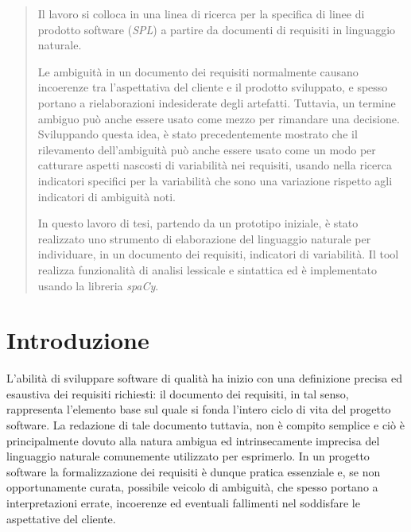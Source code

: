 \documentclass[12pt]{report}
\newcommand{\spacy}{\textsl{spaCy}\xspace}
\newcommand{\spl}{\textsl{SPL}\xspace}
\begin{document}


\clearpage\thispagestyle{empty}
\null\newpage


\tableofcontents


\clearpage\thispagestyle{empty}
\null\newpage

\clearpage\thispagestyle{empty}
\null\newpage


\setcounter{tempCntr}{\value{page}}


\begin{abstract}
\thispagestyle{plain}
\setcounter{page}{\value{tempCntr}}
Il lavoro si colloca in una linea di ricerca per la specifica di linee di prodotto software (\spl) a partire da documenti di requisiti in linguaggio naturale.

Le ambiguità in un documento dei requisiti normalmente causano incoerenze tra l'aspettativa del cliente e il prodotto sviluppato, e spesso portano a rielaborazioni indesiderate degli artefatti.  Tuttavia, un termine ambiguo può anche essere usato come mezzo per rimandare una decisione. Sviluppando questa idea, è stato precedentemente mostrato che il rilevamento dell'ambiguità può anche essere usato come un modo per catturare aspetti nascosti di variabilità nei requisiti, usando nella ricerca indicatori specifici per la variabilità che sono una variazione rispetto agli indicatori di ambiguità noti.

In questo lavoro di tesi, partendo da un prototipo iniziale, è stato realizzato uno strumento di elaborazione del linguaggio naturale  per individuare, in un documento dei requisiti, indicatori di variabilità. Il tool realizza funzionalità di analisi lessicale e sintattica ed è  implementato usando la libreria \spacy.
\end{abstract}




\clearpage\thispagestyle{empty}
\null\newpage




\chapter{Introduzione}
L’abilità di sviluppare software di qualità ha inizio con una definizione precisa ed esaustiva dei requisiti richiesti: il documento dei requisiti, in tal senso, rappresenta l'elemento base sul quale si fonda l’intero ciclo di vita del progetto software. La redazione di tale documento tuttavia, non è compito semplice e ciò è principalmente dovuto alla natura ambigua ed intrinsecamente imprecisa del linguaggio naturale comunemente utilizzato per esprimerlo. In un progetto software la formalizzazione dei requisiti è dunque pratica essenziale e, se non opportunamente curata, possibile veicolo di ambiguità, che spesso portano a interpretazioni errate, incoerenze ed eventuali fallimenti nel soddisfare le aspettative del cliente.
\end{document}
